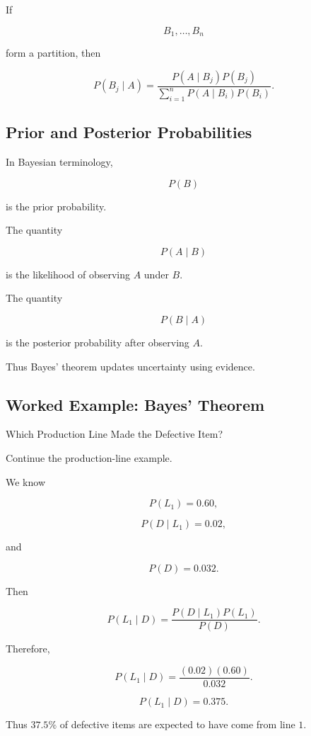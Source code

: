 If

\[
B_1,\ldots,B_n
\]

form a partition, then

\[
\boxed{
P(B_j\mid A)
=
\frac{
P(A\mid B_j)P(B_j)
}{
\sum_{i=1}^{n}
P(A\mid B_i)P(B_i)
}.
}
\]

\subsection{Prior and Posterior Probabilities}
\label{subsec:prior-posterior}

In Bayesian terminology,

\[
P(B)
\]

is the prior probability.

The quantity

\[
P(A\mid B)
\]

is the likelihood of observing \(A\) under \(B\).

The quantity

\[
P(B\mid A)
\]

is the posterior probability after observing \(A\).

Thus Bayes' theorem updates uncertainty using evidence.

\subsection{Worked Example: Bayes' Theorem}
\label{subsec:worked-bayes-production}

\begin{workedexamplebox}{Which Production Line Made the Defective Item?}

Continue the production-line example.

We know

\[
P(L_1)=0.60,
\]

\[
P(D\mid L_1)=0.02,
\]

and

\[
P(D)=0.032.
\]

Then

\[
P(L_1\mid D)
=
\frac{
P(D\mid L_1)P(L_1)
}{
P(D)
}.
\]

Therefore,

\[
P(L_1\mid D)
=
\frac{(0.02)(0.60)}{0.032}.
\]

\begin{answerbox}
\[
\boxed{
P(L_1\mid D)=0.375.
}
\]
\end{answerbox}

Thus \(37.5\%\) of defective items are expected to have come from
line \(1\).

\end{workedexamplebox}

